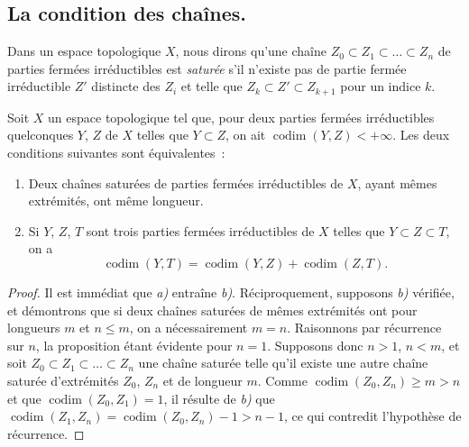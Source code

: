 \subsection{La condition des chaînes.}
\label{subsection:0.14.3-fr}

\begin{env}[14.3.1]
\label{0.14.3.1-fr}
Dans un espace topologique $X$, nous dirons qu'une chaîne
$Z_0\subset Z_1\subset\ldots\subset Z_n$ de parties fermées irréductibles est
\emph{saturée} s'il n'existe pas de partie fermée irréductible $Z'$ distincte
des $Z_i$ et telle que $Z_k\subset Z'\subset Z_{k+1}$ pour un indice $k$.
\end{env}

\begin{proposition}[14.3.2]
\label{0.14.3.2-fr}
Soit $X$ un espace topologique tel que, pour deux parties fermées
irréductibles quelconques $Y$, $Z$ de $X$ telles que $Y\subset Z$, on ait
$\operatorname{codim}(Y,Z)<+\infty$. Les deux conditions suivantes sont
équivalentes~:
\begin{enumerate}
  \item[\rm a)] Deux chaînes saturées de parties fermées irréductibles de $X$,
  ayant mêmes extrémités, ont même longueur.
  \item[\rm b)] Si $Y$, $Z$, $T$ sont trois parties fermées irréductibles de
  $X$ telles que $Y\subset Z\subset T$, on a
  \[
    \operatorname{codim}(Y,T)=
    \operatorname{codim}(Y,Z)+\operatorname{codim}(Z,T).
    \tag{14.3.2.1}\label{0.14.3.2.1-fr}
  \]
\end{enumerate}
\end{proposition}

\begin{proof}
Il est immédiat que \emph{a)} entraîne \emph{b)}. Réciproquement, supposons \emph{b)} vérifiée, et
démontrons que si deux chaînes saturées de mêmes extrémités ont pour longueurs
$m$ et $n\leq m$, on a nécessairement $m=n$. Raisonnons par récurrence sur
$n$, la proposition étant évidente pour $n=1$. Supposons donc $n>1$, $n<m$,
et soit $Z_0\subset Z_1\subset\ldots\subset Z_n$ une
chaîne saturée telle qu'il existe une autre chaîne saturée d'extrémités
$Z_0$, $Z_n$ et de longueur $m$. Comme
$\operatorname{codim}(Z_0,Z_n)\geq m>n$ et que
$\operatorname{codim}(Z_0,Z_1)=1$, il résulte de \emph{b)} que
$\operatorname{codim}(Z_1,Z_n)=\operatorname{codim}(Z_0,Z_n)-1>n-1$, ce qui
contredit l'hypothèse de récurrence.
\end{proof}

